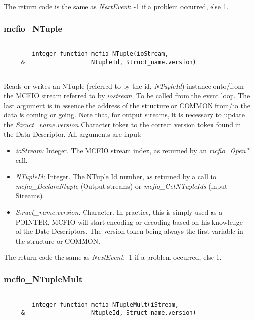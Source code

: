 The return code is the same as {\em NextEvent}: -1 if a problem occurred,
else 1. 

\subsubsection{mcfio\_NTuple}

\begin{verbatim}

        integer function mcfio_NTuple(ioStream,
     &                   NtupleId, Struct_name.version)
     
\end{verbatim}

	Reads or writes an NTuple (referred to by the id, {\em NTupleId}) 
instance onto/from the MCFIO stream referred to by {\em iostream}. To be called 
from the event loop. The last argument is in essence the address of the 
structure or COMMON from/to the data is coming or going. Note that, for 
output streams, it is necessary to update the {\em Struct\_name.version} 
Character token to the correct version token found in the Data Descriptor.
All arguments are input: 

\begin{itemize}
\item {\em ioStream:} Integer. The MCFIO stream index, as returned by an {\em
mcfio\_Open*} call. 
\item {\em NTupleId:} Integer. The NTuple Id number, as returned by a call to
{\em mcfio\_DeclareNtuple} (Output streams) or {\em mcfio\_GetNTupleIds} 
(Input Streams). 
\item {\em Struct\_name.version:} Character. In practice, this is simply used
as a POINTER, MCFIO will start encoding or decoding based on his knowledge 
of the Date Descriptors.  The version token being always the first variable
in the structure or COMMON.  
\end{itemize}	
	The return code the same as {\em NextEvent}: -1 if a problem occurred,
else 1. 

\subsubsection{mcfio\_NTupleMult}

\begin{verbatim}

        integer function mcfio_NTupleMult(iStream,
     &                   NtupleId, Struct_name.version)
     
\end{verbatim}

